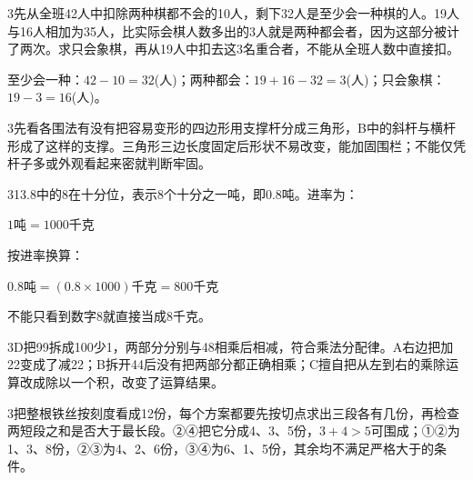 \documentclass[multi=snippet,border={5bp 20bp 5bp 5bp}]{standalone}
\newenvironment{snippet}[3]{\begin{minipage}{#1bp}\color{answerred}\fontsize{#2}{#3}\selectfont\raggedright}{\end{minipage}}
\begin{document}
\begin{snippet}{505}{11.5}{14}\begin{multicols}{3}\raggedcolumns 先从全班42人中扣除两种棋都不会的10人，剩下32人是至少会一种棋的人。19人与16人相加为35人，比实际会棋人数多出的3人就是两种都会者，因为这部分被计了两次。求只会象棋，再从19人中扣去这3名重合者，不能从全班人数中直接扣。\par 至少会一种：\(42-10=32\)\allowbreak (人)；两种都会：\(19+16-32=3\)\allowbreak (人)；只会象棋：\(19-3=16\)\allowbreak (人)。\end{multicols}\end{snippet}
\begin{snippet}{505}{11.5}{14}\begin{multicols}{3}\raggedcolumns 先看各围法有没有把容易变形的四边形用支撑杆分成三角形，B中的斜杆与横杆形成了这样的支撑。三角形三边长度固定后形状不易改变，能加固围栏；不能仅凭杆子多或外观看起来密就判断牢固。\end{multicols}\end{snippet}
\begin{snippet}{505}{11.5}{14}\begin{multicols}{3}\raggedcolumns 13.8中的8在十分位，表示8个十分之一吨，即0.8吨。进率为：\par\noindent\(\displaystyle 1\text{吨}=1000\text{千克}\)\allowbreak \par 按进率换算：\par\noindent\(\displaystyle 0.8\text{吨}=(0.8\times1000)\text{千克}=800\text{千克}\)\allowbreak \par 不能只看到数字8就直接当成8千克。\end{multicols}\end{snippet}
\begin{snippet}{505}{11.5}{14}\begin{multicols}{3}\raggedcolumns D把99拆成100少1，两部分分别与48相乘后相减，符合乘法分配律。A右边把加22变成了减22；B拆开44后没有把两部分都正确相乘；C擅自把从左到右的乘除运算改成除以一个积，改变了运算结果。\end{multicols}\end{snippet}
\begin{snippet}{505}{11.5}{14}\begin{multicols}{3}\raggedcolumns 把整根铁丝按刻度看成12份，每个方案都要先按切点求出三段各有几份，再检查两短段之和是否大于最长段。②④把它分成4、3、5份，\(3+4>5\)\allowbreak 可围成；①②为1、3、8份，②③为4、2、6份，③④为6、1、5份，其余均不满足严格大于的条件。\end{multicols}\end{snippet}
\end{document}
